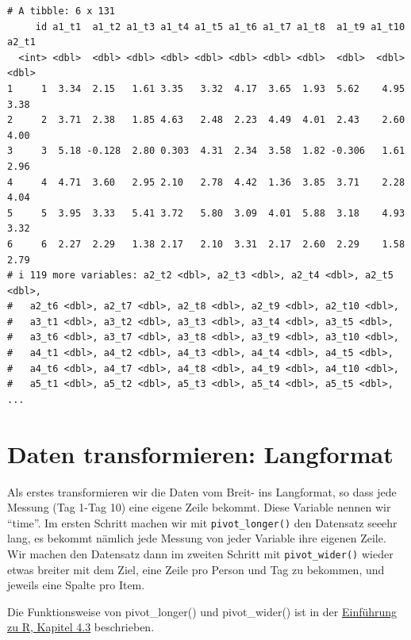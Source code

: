 \documentclass[
  letterpaper,
  DIV=11,
  numbers=noendperiod]{scrreprt}
\begin{document}
\begin{verbatim}
# A tibble: 6 x 131
     id a1_t1  a1_t2 a1_t3 a1_t4 a1_t5 a1_t6 a1_t7 a1_t8  a1_t9 a1_t10 a2_t1
  <int> <dbl>  <dbl> <dbl> <dbl> <dbl> <dbl> <dbl> <dbl>  <dbl>  <dbl> <dbl>
1     1  3.34  2.15   1.61 3.35   3.32  4.17  3.65  1.93  5.62    4.95  3.38
2     2  3.71  2.38   1.85 4.63   2.48  2.23  4.49  4.01  2.43    2.60  4.00
3     3  5.18 -0.128  2.80 0.303  4.31  2.34  3.58  1.82 -0.306   1.61  2.96
4     4  4.71  3.60   2.95 2.10   2.78  4.42  1.36  3.85  3.71    2.28  4.04
5     5  3.95  3.33   5.41 3.72   5.80  3.09  4.01  5.88  3.18    4.93  3.32
6     6  2.27  2.29   1.38 2.17   2.10  3.31  2.17  2.60  2.29    1.58  2.79
# i 119 more variables: a2_t2 <dbl>, a2_t3 <dbl>, a2_t4 <dbl>, a2_t5 <dbl>,
#   a2_t6 <dbl>, a2_t7 <dbl>, a2_t8 <dbl>, a2_t9 <dbl>, a2_t10 <dbl>,
#   a3_t1 <dbl>, a3_t2 <dbl>, a3_t3 <dbl>, a3_t4 <dbl>, a3_t5 <dbl>,
#   a3_t6 <dbl>, a3_t7 <dbl>, a3_t8 <dbl>, a3_t9 <dbl>, a3_t10 <dbl>,
#   a4_t1 <dbl>, a4_t2 <dbl>, a4_t3 <dbl>, a4_t4 <dbl>, a4_t5 <dbl>,
#   a4_t6 <dbl>, a4_t7 <dbl>, a4_t8 <dbl>, a4_t9 <dbl>, a4_t10 <dbl>,
#   a5_t1 <dbl>, a5_t2 <dbl>, a5_t3 <dbl>, a5_t4 <dbl>, a5_t5 <dbl>, ...
\end{verbatim}

\section{Daten transformieren:
Langformat}\label{daten-transformieren-langformat}

Als erstes transformieren wir die Daten vom Breit- ins Langformat, so
dass jede Messung (Tag 1-Tag 10) eine eigene Zeile bekommt. Diese
Variable nennen wir ``time''. Im ersten Schritt machen wir mit
\texttt{pivot\_longer()} den Datensatz seeehr lang, es bekommt nämlich
jede Messung von jeder Variable ihre eigenen Zeile. Wir machen den
Datensatz dann im zweiten Schritt mit \texttt{pivot\_wider()} wieder
etwas breiter mit dem Ziel, eine Zeile pro Person und Tag zu bekommen,
und jeweils eine Spalte pro Item.

Die Funktionsweise von pivot\_longer() und pivot\_wider() ist in der
\href{https://methodenlehre.github.io/einfuehrung-in-R/chapters/04-tidyverse.html\#4_3_reshaping}{Einführung
zu R, Kapitel 4.3} beschrieben.
\end{document}
